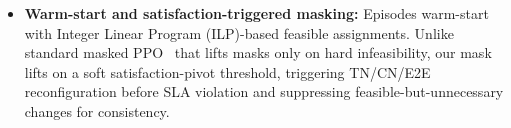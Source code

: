 \documentclass[12pt,lettersize,journal,onecolumn]{IEEEtran}
\begin{document}
\begin{itemize}[leftmargin=1.1em,labelsep=0.3em]
\item \textbf{Warm-start and satisfaction-triggered masking:} Episodes warm-start with Integer Linear Program (ILP)-based feasible assignments. Unlike standard masked PPO~\cite{flairs22huang} that lifts masks only on hard infeasibility, our mask lifts on a soft satisfaction-pivot threshold, triggering TN/CN/E2E reconfiguration before SLA violation and suppressing feasible-but-unnecessary changes for consistency.




\end{itemize}
\end{document}
